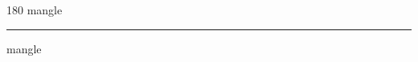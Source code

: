 
\begin{frame}
\begin{center}
\begin{turn}{180}
{\fontsize{2.5cm}{1em}\selectfont mangle}
\end{turn}
\vspace{1em}\par  
\hrule
\vspace{1em}\par  
{\fontsize{2.5cm}{1em}\selectfont mangle}
\end{center}
\end{frame}
